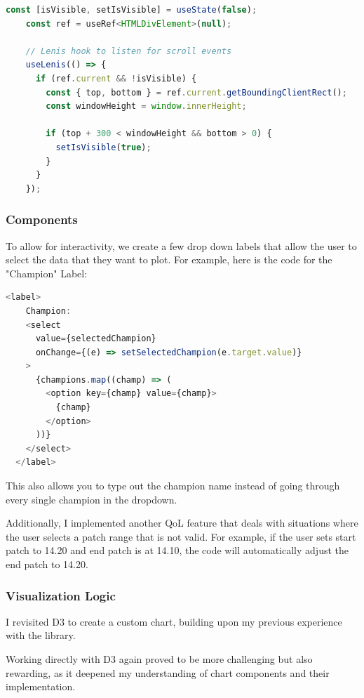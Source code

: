 \documentclass{article}
\begin{document}
\begin{lstlisting}[language=JavaScript]
const [isVisible, setIsVisible] = useState(false);
    const ref = useRef<HTMLDivElement>(null);
  
    // Lenis hook to listen for scroll events
    useLenis(() => {
      if (ref.current && !isVisible) {
        const { top, bottom } = ref.current.getBoundingClientRect();
        const windowHeight = window.innerHeight;
  
        if (top + 300 < windowHeight && bottom > 0) {
          setIsVisible(true);
        }
      }
    });
\end{lstlisting}

\subsubsection{Components}
\label{subsubsec:Components}

To allow for interactivity, we create a few drop down labels that allow the user
to select the data that they want to plot. For example, here is the code
for the "Champion" Label:

\begin{lstlisting}[language=JavaScript]
  <label>
    Champion:
    <select
      value={selectedChampion}
      onChange={(e) => setSelectedChampion(e.target.value)}
    >
      {champions.map((champ) => (
        <option key={champ} value={champ}>
          {champ}
        </option>
      ))}
    </select>
  </label>
\end{lstlisting}

This also allows you to type out the champion name 
instead of going through every single champion in the dropdown.

Additionally, I implemented another QoL feature that deals with situations
where the user selects a patch range that is not valid. 
For example, if the user sets start patch to 14.20 and end patch is at 14.10,
the code will automatically adjust the end patch to 14.20.

\subsubsection{Visualization Logic}
\label{subsubsec:Visualization Logic}

I revisited D3 to create a custom chart, building upon my previous 
experience with the library. 

Working directly with D3 again proved to be more challenging 
but also rewarding, as it deepened my understanding of chart components 
and their implementation.
\end{document}
